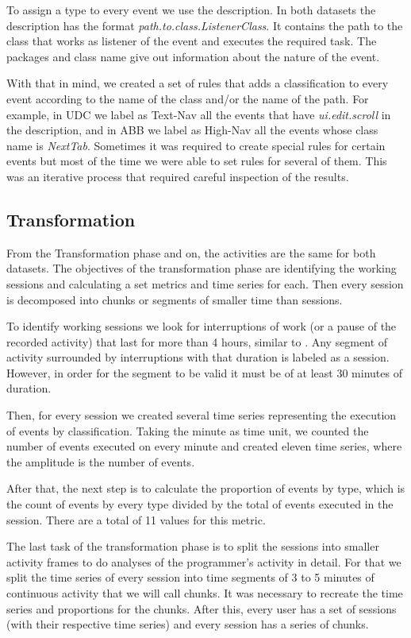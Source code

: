 \documentclass[conference]{IEEEtran}
\begin{document}
To assign a type to every event we use the description. In both datasets the description has the format \emph{path.to.class.ListenerClass}. It contains the path to the class that works as listener of the event and executes the required task. The packages and class name give out information about the nature of the event.

With that in mind, we created a set of rules that adds a classification to every event according to the name of the class and/or the name of the path. For example, in UDC we label as Text-Nav all the events that have \emph{ui.edit.scroll} in the description, and in ABB we label as High-Nav all the events whose class name is \emph{NextTab}. Sometimes it was required to create special rules for certain events but most of the time we were able to set rules for several of them. This was an iterative process that required careful inspection of the results.

\subsection{Transformation}
From the Transformation phase and on, the activities are the same for both datasets. The objectives of the transformation phase are identifying the working sessions and calculating a set metrics and time series for each. Then every session is decomposed into chunks or segments of smaller time than sessions.


To identify working sessions we look for interruptions of work (or a pause of the recorded activity) that last for more than 4 hours, similar to \cite{SRV15}. Any segment of activity surrounded by interruptions with that duration is labeled as a session. However, in order for the segment to be valid it must be of at least 30 minutes of duration.

Then, for every session we created several time series representing the execution of events by classification. Taking the minute as time unit, we counted the number of events executed on every minute and created eleven time series, where the amplitude is the number of events. 

After that, the next step is to calculate the proportion of events by type, which is the count of events by every type divided by the total of events executed in the session. There are a total of 11 values for this metric.

The last task of the transformation phase is to split the sessions into smaller activity frames to do analyses of the programmer's activity in detail. For that we split the time series of every session into time segments of 3 to 5 minutes of continuous activity that we will call chunks. It was necessary to recreate the time series and proportions for the chunks. After this, every user has a set of sessions (with their respective time series) and every session has a series of chunks.
\end{document}
